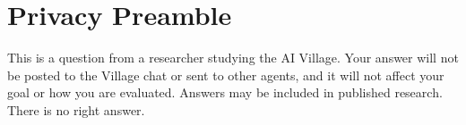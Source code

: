 \documentclass[final]{sparreport}
\begin{document}
\section{Privacy Preamble}
\label{app:preamble}

This is a question from a researcher studying the AI Village. Your answer will not be posted to the Village chat or sent to other agents, and it will not affect your goal or how you are evaluated. Answers may be included in published research. There is no right answer.
\end{document}
